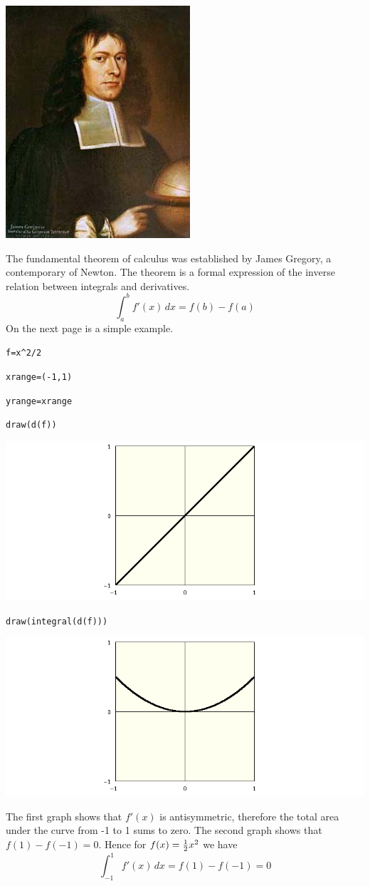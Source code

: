 \newpage

\begin{center}
\includegraphics[scale=0.5]{JamesGregory.jpeg}
\end{center}

\bigskip

\noindent
The fundamental theorem of calculus was established by James Gregory,
a contemporary of Newton.
The theorem is a formal expression of the inverse relation between
integrals and derivatives.
$$\int_a^b f'(x)\,dx=f(b)-f(a)$$
On the next page is a simple example.

\newpage

\verb$f=x^2/2$

\verb$xrange=(-1,1)$

\verb$yrange=xrange$

\verb$draw(d(f))$

\noindent
\includegraphics[scale=0.5]{funda1.png}

\verb$draw(integral(d(f)))$

\medskip
\noindent
\includegraphics[scale=0.5]{funda2.png}

\medskip
\noindent
The first graph shows that $f'(x)$ is antisymmetric, therefore the total
area under the curve from -1 to 1 sums to zero.
The second graph shows that $f(1)-f(-1)=0$.
Hence for $f(x)={1\over2}x^2$ we have
$$\int_{-1}^1f'(x)\,dx=f(1)-f(-1)=0$$


